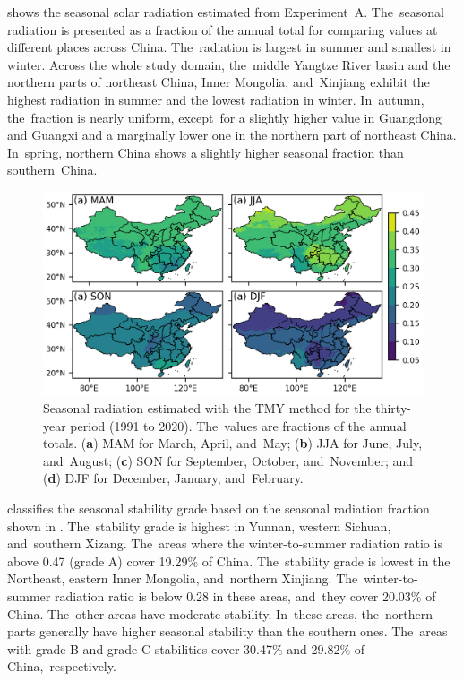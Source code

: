 \documentclass[atmosphere,article,accept,pdftex,moreauthors]{Definitions/mdpi}
\begin{document}
 shows the seasonal solar radiation estimated from Experiment~A. The~seasonal radiation is presented as a fraction of the annual total for comparing values at different places across China. The~radiation is largest in summer and smallest in winter. Across the whole study domain, the~middle Yangtze River basin and the northern parts of northeast China, Inner Mongolia, and~Xinjiang exhibit the highest radiation in summer and the lowest radiation in winter. In~autumn, the~fraction is nearly uniform, except~for a slightly higher value in Guangdong and Guangxi and a marginally lower one in the northern part of northeast China. In~spring, northern China shows a slightly higher seasonal fraction than southern~China.

\begin{figure}[H]
  \includegraphics[width=13.8cm]{fig/tmy-seasonal-fraction.png}
  \caption{Seasonal radiation estimated with the TMY method for the thirty-year period (1991 to 2020). The~values are fractions of the annual totals. (\textbf{a}) MAM for March, April, and~May; (\textbf{b}) JJA for June, July, and~August; (\textbf{c}) SON for September, October, and~November; and (\textbf{d}) DJF for December, January, and~February. \label{fig:seasonal_fraction}}
\end{figure}

 classifies the seasonal stability grade based on the seasonal radiation fraction shown in . The~stability grade is highest in Yunnan, western Sichuan, and~southern Xizang. The~areas where the winter-to-summer radiation ratio is above 0.47 (grade A) cover 19.29\% of China. The~stability grade is lowest in the Northeast, eastern Inner Mongolia, and~northern Xinjiang. The~winter-to-summer radiation ratio is below 0.28 in these areas, and~they cover 20.03\% of China. The~other areas have moderate stability. In~these areas, the~northern parts generally have higher seasonal stability than the southern ones. The~areas with grade B and grade C stabilities cover 30.47\% and 29.82\% of \mbox{China, respectively.}
\end{document}
